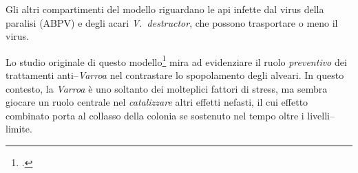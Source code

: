Gli altri compartimenti del modello riguardano le api infette dal virus della paralisi (ABPV) e degli acari
\emph{V.~destructor}, che possono trasportare o meno il virus.

Lo studio originale di questo modello\footcite{ratti2017}  mira ad evidenziare il ruolo \emph{preventivo}
dei trattamenti anti--\emph{Varroa} nel contrastare lo spopolamento degli alveari.
In questo contesto, la \emph{Varroa} è uno soltanto dei molteplici fattori di stress, ma sembra giocare
un ruolo centrale nel \emph{catalizzare} altri effetti nefasti, il cui effetto combinato porta al collasso
della colonia se sostenuto nel tempo oltre i livelli--limite.




